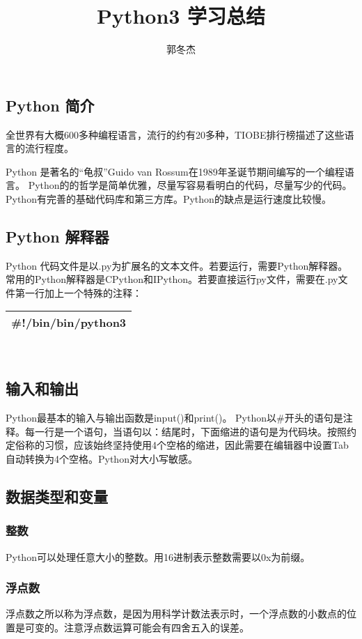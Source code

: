 \documentclass[12pt,a4paper]{article}
\begin{document}
\begin{CJK}{UTF8}{gbsn}
    \title{\textbf{Python3 学习总结}}
    \author{郭冬杰}
    \maketitle
    \section{Python 简介}
    全世界有大概600多种编程语言，流行的约有20多种，TIOBE排行榜描述了这些语言的流行程度。

    Python 是著名的“龟叔”Guido van Rossum在1989年圣诞节期间编写的一个编程语言。
    Python的的哲学是简单优雅，尽量写容易看明白的代码，尽量写少的代码。Python有完善的基础代码库和第三方库。Python的缺点是运行速度比较慢。
    \subsection{Python 解释器}
    Python 代码文件是以.py为扩展名的文本文件。若要运行，需要Python解释器。常用的Python解释器是CPython和IPython。若要直接运行py文件，需要在.py文件第一行加上一个特殊的注释：
    \begin{center}
        \begin{tabular}{|c|}
            \hline
            \#!/bin/bin/python3\\
            \hline
        \end{tabular}\\
    \end{center}
    \subsection{输入和输出}
    Python最基本的输入与输出函数是input()和print()。
    Python以\#开头的语句是注释。每一行是一个语句，当语句以：结尾时，下面缩进的语句是为代码块。按照约定俗称的习惯，应该始终坚持使用4个空格的缩进，因此需要在编辑器中设置Tab自动转换为4个空格。Python对大小写敏感。
    \subsection{数据类型和变量}
    \subsubsection{整数}
    Python可以处理任意大小的整数。用16进制表示整数需要以0x为前缀。
    \subsubsection{浮点数}
    浮点数之所以称为浮点数，是因为用科学计数法表示时，一个浮点数的小数点的位置是可变的。注意浮点数运算可能会有四舍五入的误差。

\end{CJK}
\end{document}
